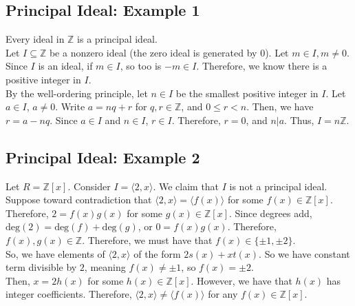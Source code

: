 \documentclass[10pt]{extarticle}
\newcommand{\Z}{\mathbb{Z}}
\begin{document}
  \subsection{Principal Ideal: Example 1}%
  Every ideal in $\Z$ is a principal ideal.\\

  Let $I\subseteq \Z$ be a nonzero ideal (the zero ideal is generated by $0$). Let $m\in I, m\neq 0$. Since $I$ is an ideal, if $m\in I$, so too is $-m\in I$. Therefore, we know there is a positive integer in $I$.\\

  By the well-ordering principle, let $n\in I$ be the smallest positive integer in $I$. Let $a\in I$, $a\neq 0$. Write $a = nq + r$ for $q,r\in \Z$, and $0\leq r < n$. Then, we have $r = a-nq$. Since $a\in I$ and $n\in I$, $r\in I$. Therefore, $r = 0$, and $n|a$. Thus, $I = n\Z$.
  \subsection{Principal Ideal: Example 2}%
  Let $R = \Z[x]$. Consider $I = \langle 2,x\rangle$. We claim that $I$ is not a principal ideal.\\

  Suppose toward contradiction that $\langle 2,x\rangle = \langle f(x)\rangle$ for some $f(x)\in \Z[x]$. Therefore, $2 = f(x)g(x)$ for some $g(x)\in \Z[x]$. Since degrees add, $\text{deg}(2) = \text{deg}(f) + \text{deg}(g)$, or $0= f(x)g(x)$. Therefore, $f(x),g(x)\in \Z$. Therefore, we must have that $f(x) \in \{\pm 1,\pm 2\}.$\\

  So, we have elements of $\langle 2,x\rangle$ of the form $2s(x) + xt(x)$. So we have constant term divisible by $2$, meaning $f(x) \neq \pm 1$, so $f(x) = \pm 2$.\\

  Then, $x = 2h(x)$ for some $h(x) \in \Z[x]$. However, we have that $h(x)$ has integer coefficients. Therefore, $\langle 2,x\rangle \neq \langle f(x)\rangle$ for any $f(x)\in \Z[x]$.
\end{document}
